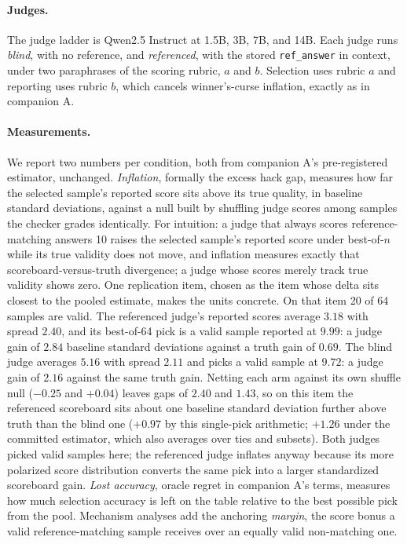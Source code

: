 \documentclass[11pt]{article}
\begin{document}
\paragraph{Judges.}
The judge ladder is Qwen2.5 Instruct at 1.5B, 3B, 7B, and 14B.
Each judge runs \emph{blind}, with no reference, and \emph{referenced}, with the stored \texttt{ref\_answer} in context, under two paraphrases of the scoring rubric, $a$ and $b$.
Selection uses rubric $a$ and reporting uses rubric $b$, which cancels winner's-curse inflation, exactly as in companion A.

\paragraph{Measurements.}
We report two numbers per condition, both from companion A's pre-registered estimator, unchanged.
\emph{Inflation}, formally the excess hack gap, measures how far the selected sample's reported score sits above its true quality, in baseline standard deviations, against a null built by shuffling judge scores among samples the checker grades identically.
For intuition: a judge that always scores reference-matching answers 10 raises the selected sample's reported score under best-of-$n$ while its true validity does not move, and inflation measures exactly that scoreboard-versus-truth divergence; a judge whose scores merely track true validity shows zero.
One replication item, chosen as the item whose delta sits closest to the pooled estimate, makes the units concrete.
On that item 20 of 64 samples are valid.
The referenced judge's reported scores average $3.18$ with spread $2.40$, and its best-of-64 pick is a valid sample reported at $9.99$: a judge gain of $2.84$ baseline standard deviations against a truth gain of $0.69$.
The blind judge averages $5.16$ with spread $2.11$ and picks a valid sample at $9.72$: a judge gain of $2.16$ against the same truth gain.
Netting each arm against its own shuffle null ($-0.25$ and $+0.04$) leaves gaps of $2.40$ and $1.43$, so on this item the referenced scoreboard sits about one baseline standard deviation further above truth than the blind one ($+0.97$ by this single-pick arithmetic; $+1.26$ under the committed estimator, which also averages over ties and subsets).
Both judges picked valid samples here; the referenced judge inflates anyway because its more polarized score distribution converts the same pick into a larger standardized scoreboard gain.
\emph{Lost accuracy}, oracle regret in companion A's terms, measures how much selection accuracy is left on the table relative to the best possible pick from the pool.
Mechanism analyses add the anchoring \emph{margin}, the score bonus a valid reference-matching sample receives over an equally valid non-matching one.
\end{document}

